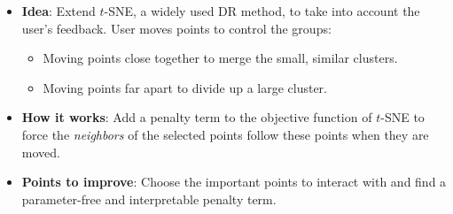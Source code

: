 \documentclass[portrait,final,a0paper]{nadiposter}
\newcommand{\compresslist}{%
\setlength{\itemsep}{1pt}%
\setlength{\parskip}{0pt}%
\setlength{\parsep}{0pt}%
\setlength{\leftmargin}{0pt}%
}
\begin{document}
\begin{poster}
{\begin{minipage}{0.52\linewidth}
\noindent
\begin{itemize}
    \item \textbf{Idea}: Extend $t$-SNE, a widely used DR method, to take into account the user's feedback. User moves points to control the groups:
    \noindent
    \begin{itemize}
        \item Moving points close together to merge the small, similar clusters. \small{\color{blue}{(a)}}
        \item Moving points far apart to divide up a large cluster. \small{\color{blue}{(b)}}
    \end{itemize}
\end{itemize}
\end{minipage}
\begin{minipage}{0.44\linewidth}
\noindent
\begin{itemize}
    \item \textbf{How it works}: Add a {\color{red} penalty term} to the objective function of $t$-SNE to force the \emph{neighbors} of the selected points follow these points when they are moved.
    \item \textbf{Points to improve}: Choose the important points to interact with and find a parameter-free and interpretable penalty term.
\end{itemize}
\end{minipage}
}



\end{poster}
\end{document}
